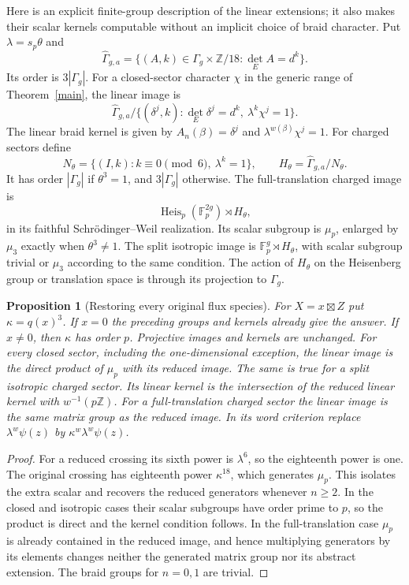 \documentclass[11pt]{amsart}
\newtheorem{proposition}[theorem]{Proposition}
\newcommand{\Fp}{\mathbb F_p}
\newcommand{\Heis}{\operatorname{Heis}}
\begin{document}
Here is an explicit finite-group description of the linear extensions;
it also makes their scalar kernels computable without an implicit
choice of braid character. Put $\lambda=s_p\theta$ and
\begin{equation}\label{hat}
\widehat\Gamma_{g,a}=
\{(A,k)\in\Gamma_g\times\mathbb Z/18:\det_E A=d^k\}.
\end{equation}
Its order is $3|\Gamma_g|$.
For a closed-sector character $\chi$ in the generic range of
Theorem~\ref{main}, the linear image is
\begin{equation}\label{closedextension}
\widehat\Gamma_{g,a}/
\{(\delta^j,k):\det_E\delta^j=d^k,\ \lambda^k\chi^j=1\}.
\end{equation}
The linear braid kernel is given by $A_n(\beta)=\delta^j$ and
$\lambda^{w(\beta)}\chi^j=1$.
For charged sectors define
\[
N_\theta=\{(I,k):k\equiv0\pmod6,\ \lambda^k=1\},\qquad
H_\theta=\widehat\Gamma_{g,a}/N_\theta.
\]
It has order $|\Gamma_g|$ if $\theta^3=1$, and $3|\Gamma_g|$ otherwise.
The full-translation charged image is
\begin{equation}\label{chargedextension}
\Heis_p(\Fp^{2g})\rtimes H_\theta,
\end{equation}
in its faithful Schr\"odinger--Weil realization. Its scalar subgroup is
$\mu_p$, enlarged by $\mu_3$ exactly when $\theta^3\ne1$.
The split isotropic image is $\Fp^g\rtimes H_\theta$, with scalar
subgroup trivial or $\mu_3$ according to the same condition.
The action of $H_\theta$ on the Heisenberg group or translation space
is through its projection to $\Gamma_g$.

\begin{proposition}[Restoring every original flux species]\label{species}
For $X=x\boxtimes Z$ put $\kappa=q(x)^3$. If $x=0$ the preceding
groups and kernels already give the answer. If $x\ne0$, then $\kappa$
has order $p$. Projective images and kernels are unchanged. For every
closed sector, including the one-dimensional exception, the linear image
is the direct product of $\mu_p$ with its reduced image. The same is
true for a split isotropic charged sector. Its linear kernel is the
intersection of the reduced linear kernel with $w^{-1}(p\mathbb Z)$.
For a full-translation charged sector the linear image is the same
matrix group as the reduced image. In its word criterion replace
$\lambda^w\psi(z)$ by $\kappa^w\lambda^w\psi(z)$.
\end{proposition}
\begin{proof}
For a reduced crossing its sixth power is $\lambda^6$, so the
eighteenth power is one. The original crossing has eighteenth power
$\kappa^{18}$, which generates $\mu_p$. This isolates the extra scalar
and recovers the reduced generators whenever $n\ge2$. In the closed
and isotropic cases their scalar subgroups have order prime to $p$,
so the product is direct and the kernel condition follows. In the
full-translation case $\mu_p$ is already contained in the reduced
image, and hence multiplying generators by its elements changes
neither the generated matrix group nor its abstract extension.
The braid groups for $n=0,1$ are trivial.
\end{proof}
\end{document}
